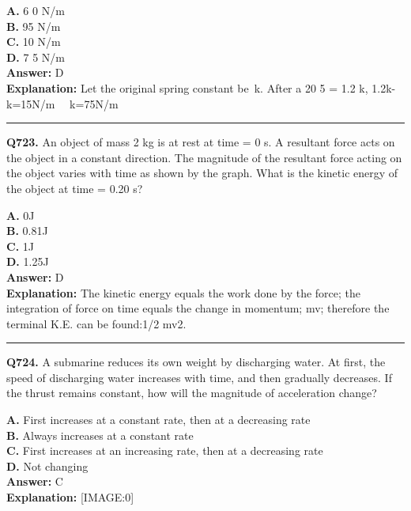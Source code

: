 \documentclass[12pt]{article}
\begin{document}
\textbf{A.} 6
0 N/m \\
\textbf{B.} 95 N/m \\
\textbf{C.} 10 N/m \\
\textbf{D.} 7
5 N/m \\

\textbf{Answer:} D \\
\textbf{Explanation:} Let the original spring constant be k. After a 20%
5
=
1.2
k,
1.2k-k=15N/m   k=75N/m

\hrule
\vspace{1em}


\noindent
\textbf{Q723.} An object of mass 2 kg is at rest at time = 0 s. A resultant force acts on the object in a constant direction.
The magnitude of the resultant force acting on the object varies with time as shown by
the graph.
What is the kinetic energy of the object at time = 0.20 s?



\textbf{A.} 0J \\
\textbf{B.} 0.81J \\
\textbf{C.} 1J \\
\textbf{D.} 1.25J \\

\textbf{Answer:} D \\
\textbf{Explanation:} The kinetic energy equals the work done by the force; the integration of force on time equals the change in momentum; mv; therefore the terminal K.E. can be found:1/2 mv2.

\hrule
\vspace{1em}


\noindent
\textbf{Q724.} A submarine reduces its own weight by discharging water. At first, the speed of discharging water increases with time, and then gradually decreases. If the thrust remains constant, how will the magnitude of acceleration change?



\textbf{A.} First increases at a constant rate, then at a decreasing rate \\
\textbf{B.} Always increases at a constant rate \\
\textbf{C.} First increases at an increasing rate, then at a decreasing rate \\
\textbf{D.} Not changing \\

\textbf{Answer:} C \\
\textbf{Explanation:} [IMAGE:0]
\end{document}
